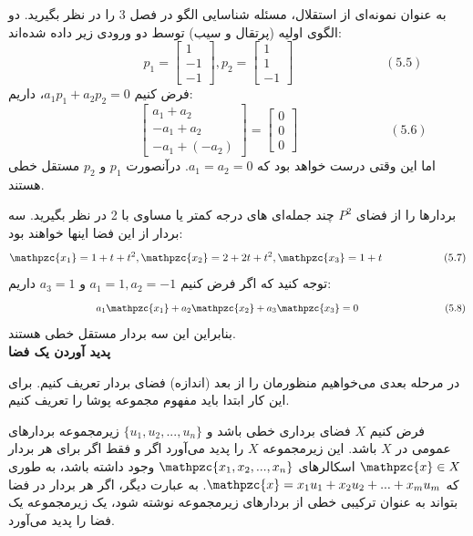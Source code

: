 \documentclass[a4paper,12pt]{report}
\begin{document}
	به عنوان نمونه‌ای از استقلال، مسئله شناسایی الگو در فصل 3 را در نظر بگیرید. دو الگوی اولیه (پرتقال و سیب) توسط دو ورودی زیر داده شده‌اند:
	$$
	\hspace{3cm}
	p_1 = 
	\begin{bmatrix}
		1 \\ -1 \\ -1
	\end{bmatrix}
	, p_2 = 
	\begin{bmatrix}
		1 \\ 1 \\ -1
	\end{bmatrix}
	\hspace{3cm} (5.5)
	$$
	فرض کنیم $ a_1p_1 + a_2p_2 = 0 $، داریم:
	$$
	\hspace{3cm}
	\begin{bmatrix}
		a_1+a_2 \\ -a_1+a_2 \\ -a_1+(-a_2)
	\end{bmatrix}
	= 
	\begin{bmatrix}
		0 \\ 0 \\ 0
	\end{bmatrix}
	\hspace{3cm} (5.6)
	$$
	اما این وقتی درست خواهد بود که $ a_1 = a_2 = 0 $. درآنصورت $ p_1 $ و $ p_2 $ مستقل خطی هستند.
	
	بردارها را از فضای $ P^2 $ چند جمله‌ای های درجه کمتر یا مساوی با 2 در نظر بگیرید. سه بردار از این فضا اینها خواهند بود:
	$$
	\mathpzc{x_1}=1+t+t^2 , \mathpzc{x_2}=2+2t+t^2 , \mathpzc{x_3}=1+t \hspace{2cm} (5.7)
	$$
	توجه کنید که اگر فرض کنیم $ a_1=1 , a_2=-1 $ و $ a_3=1 $ داریم:
	$$
	\hspace{3cm} a_1\mathpzc{x_1} + a_2\mathpzc{x_2} + a_3\mathpzc{x_3} = 0 \hspace{3cm} (5.8)
	$$
	بنابراین این سه بردار مستقل خطی هستند.\\
	
	\noindent\textbf{\Large{پدید آوردن یک فضا}}	
	
	در مرحله بعدی می‌خواهیم منظورمان را از بعد (اندازه) فضای بردار تعریف کنیم. برای این کار ابتدا باید مفهوم مجموعه پوشا را تعریف کنیم.
	
	فرض کنیم $ X $ فضای برداری خطی باشد و $ \{ u_1,u_2,...,u_n \} $ زیرمجموعه بردارهای عمومی در $ X $ باشد. این زیرمجموعه $ X $ را پدید می‌آورد اگر و فقط اگر برای هر بردار 
	$ \mathpzc{x} \in X $
	 اسکالرهای
	$ \mathpzc{x_1,x_2,...,x_n} $
	 وجود داشته باشد، به طوری که
	$ \mathpzc{x} = x_1u_1+x_2u_2+...+x_mu_m $.
	 به عبارت دیگر، اگر هر بردار در فضا بتواند به عنوان ترکیبی خطی از بردارهای زیرمجموعه نوشته شود، یک زیرمجموعه یک فضا را پدید می‌آورد.
	
\end{document}
